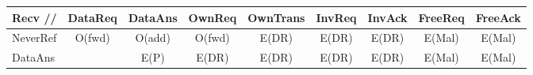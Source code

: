 \documentclass{standalone}
\begin{document}
\begin{tabular}{|l|*8{c|}}\hline
	\textbf{Recv //} & DataReq & DataAns & OwnReq & OwnTrans & InvReq & InvAck & FreeReq & FreeAck \\\hline
	NeverRef         & O(fwd)  & O(add)  & O(fwd) & E(DR)    & E(DR)  & E(DR)  & E(Mal)  & E(Mal)  \\\hline
	DataAns          &         & E(P)    & E(DR)  & E(DR)    & E(DR)  & E(DR)  & E(Mal)  & E(Mal)  \\\hline
\end{tabular}
\end{document}
